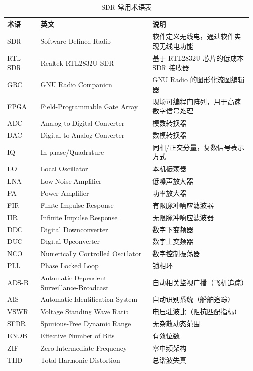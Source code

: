 \documentclass[12pt,UTF8]{ctexbook}
\begin{document}
\begin{table}[htbp]
\centering
\caption{SDR 常用术语表}
\label{tab:sdr_glossary}
\begin{tabular}{@{}lp{6cm}p{6cm}@{}}
    \toprule
    \textbf{术语} & \textbf{英文} & \textbf{说明} \\
    \midrule
    SDR & Software Defined Radio & 软件定义无线电，通过软件实现无线电功能 \\
    RTL-SDR & Realtek RTL2832U SDR & 基于 RTL2832U 芯片的低成本 SDR 接收器 \\
    GRC & GNU Radio Companion & GNU Radio 的图形化流图编辑器 \\
    FPGA & Field-Programmable Gate Array & 现场可编程门阵列，用于高速数字信号处理 \\
    ADC & Analog-to-Digital Converter & 模数转换器 \\
    DAC & Digital-to-Analog Converter & 数模转换器 \\
    IQ & In-phase/Quadrature & 同相/正交分量，复数信号表示方式 \\
    LO & Local Oscillator & 本机振荡器 \\
    LNA & Low Noise Amplifier & 低噪声放大器 \\
    PA & Power Amplifier & 功率放大器 \\
    FIR & Finite Impulse Response & 有限脉冲响应滤波器 \\
    IIR & Infinite Impulse Response & 无限脉冲响应滤波器 \\
    DDC & Digital Downconverter & 数字下变频器 \\
    DUC & Digital Upconverter & 数字上变频器 \\
    NCO & Numerically Controlled Oscillator & 数字控制振荡器 \\
    PLL & Phase Locked Loop & 锁相环 \\
    ADS-B & Automatic Dependent Surveillance-Broadcast & 自动相关监视广播（飞机追踪） \\
    AIS & Automatic Identification System & 自动识别系统（船舶追踪） \\
    VSWR & Voltage Standing Wave Ratio & 电压驻波比（阻抗匹配指标） \\
    SFDR & Spurious-Free Dynamic Range & 无杂散动态范围 \\
    ENOB & Effective Number of Bits & 有效位数 \\
    ZIF & Zero Intermediate Frequency & 零中频架构 \\
    THD & Total Harmonic Distortion & 总谐波失真 \\
    \bottomrule
\end{tabular}
\end{table}
\end{document}
